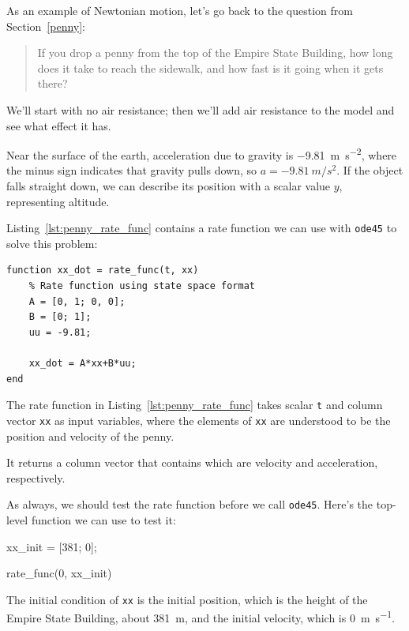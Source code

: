 As an example of Newtonian motion, let's go back to the question from Section~\ref{penny}:

\begin{quote}
If you drop a penny from the top of the Empire State Building, how long does it take to reach the sidewalk, and how fast is it going when it gets there?
\end{quote}

We'll start with no air resistance; then we'll add air resistance to the model and see what effect it has.


Near the surface of the earth,
acceleration due to gravity is \SI{-9.81}{\meter \per \second \squared}, where the minus sign
indicates that gravity pulls down, so $a=\SI{-9.81}{m/s^2}$.
If the object falls straight down, we can describe its position with a
scalar value $y$, representing altitude.

Listing~\ref{lst:penny_rate_func} contains a rate function we can use with \lstinline{ode45} to solve
this problem:

\begin{lstlisting}[caption={A rate function for the falling penny problem}, label={lst:penny_rate_func}]
function xx_dot = rate_func(t, xx)
    % Rate function using state space format
    A = [0, 1; 0, 0];
    B = [0; 1];
    uu = -9.81;
    
    xx_dot = A*xx+B*uu;
end
\end{lstlisting}

The rate function in Listing~\ref{lst:penny_rate_func} takes scalar \lstinline{t} and column vector \lstinline{xx} as input variables, where the elements of \lstinline{xx} are understood to be the position and velocity of the penny.

It returns a column vector that contains which are velocity and acceleration, respectively.

As always, we should test the rate function before we call \lstinline{ode45}.  Here's the top-level function we can use to test it:

\begin{code}
xx_init = [381; 0];

rate_func(0, xx_init)
\end{code}

The initial condition of \lstinline{xx} is the initial position, which is the height of the Empire State Building, about \SI{381}{\meter}, and the initial velocity, which is \SI{0}{\meter \per \second}.

